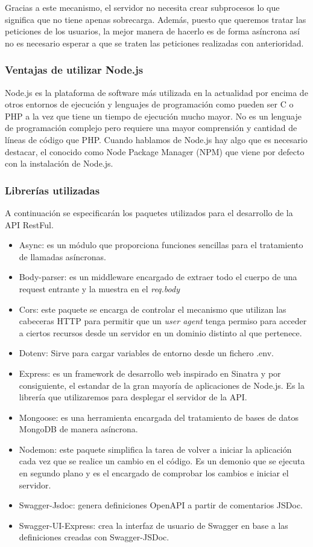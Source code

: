 Gracias a este mecanismo, el servidor no necesita crear subprocesos lo que significa que no tiene apenas sobrecarga. Además, puesto que queremos tratar las peticiones de los usuarios, la mejor manera de hacerlo es de forma asíncrona así no es necesario esperar a que se traten las peticiones realizadas con anterioridad.


\subsubsection{Ventajas de utilizar Node.js}

Node.js es la plataforma de software más utilizada en la actualidad por encima de otros entornos de ejecución y lenguajes de programación como pueden ser C o PHP a la vez que tiene un tiempo de ejecución mucho mayor. No es un lenguaje de programación complejo pero requiere una mayor comprensión y cantidad de líneas de código que PHP. Cuando hablamos de Node.js hay algo que es necesario destacar, el conocido como Node Package Manager (NPM) que viene por defecto con la instalación de Node.js.


\subsubsection{Librerías utilizadas}A continuación se especificarán los paquetes utilizados para el desarrollo de la API RestFul.

\begin{itemize}
    \item Async: es un módulo que proporciona funciones sencillas para el tratamiento de llamadas asíncronas.
    \item Body-parser: es un middleware encargado de extraer todo el cuerpo de una request entrante y la muestra en el \textit{req.body} 
    \item Cors: este paquete se encarga de controlar el mecanismo que utilizan las cabeceras HTTP para permitir que un \textit{user agent} tenga permiso para acceder a ciertos recursos desde un servidor en un dominio distinto al que pertenece.
    \item Dotenv: Sirve para cargar variables de entorno desde un fichero .env.
    \item Express: es un framework de desarrollo web inspirado en Sinatra y por consiguiente, el estandar de la gran mayoría de aplicaciones de Node.js. Es la librería que utilizaremos para desplegar el servidor de la API.  
    \item Mongoose: es una herramienta encargada del tratamiento de bases de datos MongoDB de manera asíncrona.
    \item Nodemon: este paquete simplifica la tarea de volver a iniciar la aplicación cada vez que se realice un cambio en el código. Es un demonio que se ejecuta en segundo plano y es el encargado de comprobar los cambios e iniciar el servidor.
    \item Swagger-Jsdoc: genera definiciones OpenAPI a partir de comentarios JSDoc.
    \item Swagger-UI-Express: crea la interfaz de usuario de Swagger en base a las definiciones creadas con Swagger-JSDoc.
\end{itemize}

